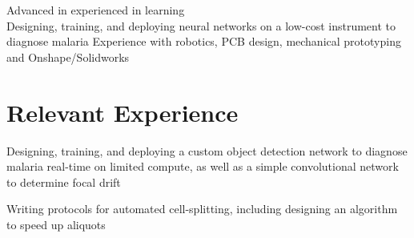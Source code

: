\documentclass[]{deedy-resume-openfont}
\begin{document}

\begin{minipage}[t]{\textwidth}
   Advanced in  experienced in   learning   \\
  \ifdef{\software} {
     Designing, training, and deploying neural networks on a low-cost instrument to diagnose malaria
  } {
    \ifdef{\robotics} {
       Experience with robotics, PCB design, mechanical prototyping and Onshape/Solidworks
    }{}
  }
\end{minipage}

\vspace{12pt}

\section{Relevant Experience}

\begin{tightemize}


\item Designing, training, and deploying a custom object detection network to diagnose malaria real-time on limited compute, as well as a simple convolutional network to determine focal drift
\item Writing protocols for automated cell-splitting, including designing an algorithm to speed up aliquots
\end{tightemize}
\end{document}
